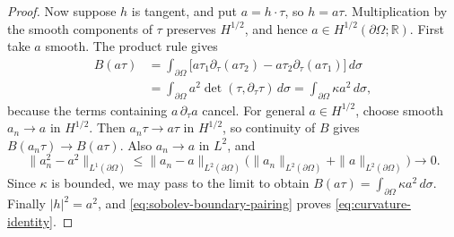 \begin{proof}
Now suppose $h$ is tangent, and put $a=h\cdot\tau$, so $h=a\tau$.
Multiplication by the smooth components of $\tau$ preserves $H^{1/2}$,
and hence $a\in H^{1/2}(\partial\Omega;\mathbb R)$.
First take $a$ smooth. The product rule gives
\[
 \begin{aligned}
 B(a\tau)
 &=\int_{\partial\Omega}
   \bigl[a\tau_1\partial_\tau(a\tau_2)
         -a\tau_2\partial_\tau(a\tau_1)\bigr]\,d\sigma\\
 &=\int_{\partial\Omega}
       a^2\det(\tau,\partial_\tau\tau)\,d\sigma
 =\int_{\partial\Omega}\kappa a^2\,d\sigma,
 \end{aligned}
\]
because the terms containing $a\,\partial_\tau a$ cancel.
For general $a\in H^{1/2}$, choose smooth $a_n\to a$ in $H^{1/2}$.
Then $a_n\tau\to a\tau$ in $H^{1/2}$, so continuity of $B$ gives
$B(a_n\tau)\to B(a\tau)$. Also $a_n\to a$ in $L^2$, and
\[
 \|a_n^2-a^2\|_{L^1(\partial\Omega)}
 \le\|a_n-a\|_{L^2(\partial\Omega)}
      \bigl(\|a_n\|_{L^2(\partial\Omega)}
            +\|a\|_{L^2(\partial\Omega)}\bigr)\to0.
\]
Since $\kappa$ is bounded, we may pass to the limit to obtain
$B(a\tau)=\int_{\partial\Omega}\kappa a^2\,d\sigma$.
Finally $|h|^2=a^2$, and \cref{eq:sobolev-boundary-pairing} proves
\cref{eq:curvature-identity}.
\end{proof}
